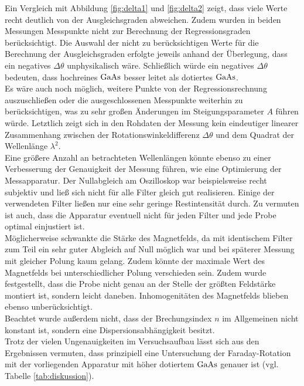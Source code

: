 Ein Vergleich mit Abbildung \ref{fig:delta1} und \ref{fig:delta2} zeigt, dass viele Werte recht deutlich von der Ausgleichsgraden abweichen. Zudem wurden in beiden Messungen Messpunkte nicht zur Berechnung der Regressionsgraden berücksichtigt. Die Auswahl der nicht zu berücksichtigen Werte für die Berechnung der Ausgleichsgraden erfolgte jeweils anhand der Überlegung, dass ein negatives $\Delta\theta$ unphysikalisch wäre. Schließlich würde ein negatives $\Delta\theta$ bedeuten, dass hochreines $\ce{GaAs}$ besser leitet als dotiertes $\ce{GaAs}$.\\
Es wäre auch noch möglich, weitere Punkte von der Regressionsrechnung auszuschließen oder die ausgeschlossenen Messpunkte weiterhin zu berücksichtigen, was zu sehr großen Änderungen im Steigungsparameter $A$ führen würde.
Letztlich zeigt sich in den Rohdaten der Messung kein eindeutiger linearer Zusammenhang zwischen der Rotationswinkeldifferenz $\Delta\theta$ und dem Quadrat der Wellenlänge $\lambda^{2}$.\\
Eine größere Anzahl an betrachteten Wellenlängen könnte ebenso zu einer Verbesserung der Genauigkeit der Messung führen, wie eine Optimierung der Messapparatur.
Der Nullabgleich am Oszilloskop war beispielsweise recht subjektiv und ließ sich nicht für alle Filter gleich gut realisieren.
Einige der verwendeten Filter ließen nur eine sehr geringe Restintensität durch.
Zu vermuten ist auch, dass die Apparatur eventuell nicht für jeden Filter und jede Probe optimal einjustiert ist.\\
Möglicherweise schwankte die Stärke des Magnetfelds, da mit identischem Filter zum Teil ein sehr guter Abgleich auf Null möglich war und bei späterer Messung mit gleicher Polung kaum gelang. Zudem könnte der maximale Wert des Magnetfelds bei unterschiedlicher Polung verschieden sein. Zudem wurde festgestellt, dass die Probe nicht genau an der Stelle der größten Feldstärke montiert ist, sondern leicht daneben. Inhomogenitäten des Magnetfelds blieben ebenso unberücksichtigt.\\
Beachtet wurde außerdem nicht, dass der Brechungsindex $n$ im Allgemeinen nicht konstant ist, sondern eine Dispersionsabhängigkeit besitzt.\\

Trotz der vielen Ungenauigkeiten im Versuchsaufbau lässt sich aus den Ergebnissen vermuten, dass prinzipiell eine Untersuchung der Faraday-Rotation mit der vorliegenden Apparatur mit höher dotiertem $\ce{GaAs}$ genauer ist (vgl. Tabelle \ref{tab:diskussion}).
